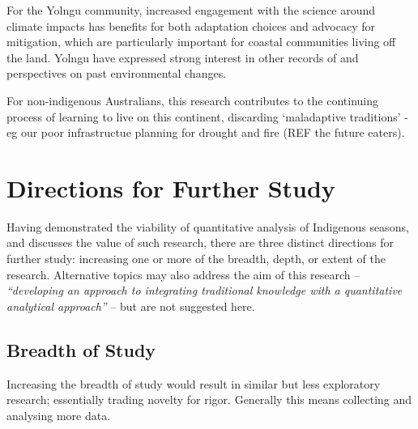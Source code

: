 For the Yolngu community, increased engagement with the science around climate
impacts has benefits for both adaptation choices and advocacy for mitigation,
which are particularly important for coastal communities living off the land.
Yolngu have expressed strong interest in other records of and perspectives on
past environmental changes.

For non-indigenous Australians, this research contributes to the continuing
process of learning to live on this continent, discarding `maladaptive traditions'
- eg our poor infrastructue planning for drought and fire (REF the future eaters).



\section{Directions for Further Study}
\label{sec:further-study}

Having demonstrated the viability of quantitative analysis of Indigenous
seasons, and discusses the value of such research, there are three distinct
directions for further study:  increasing one or more of the breadth, depth,
or extent of the research.  Alternative topics may also address the aim
of this research -- \textit{``developing an approach to integrating traditional
knowledge with a quantitative analytical approach''} -- but are not suggested
here.


\subsection{Breadth of Study}

Increasing the breadth of study would result in similar but less exploratory
research; essentially trading novelty for rigor.  Generally this means
collecting and analysing more data.

